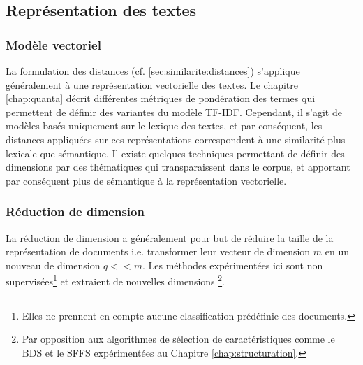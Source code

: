 


\subsection{Représentation des textes}
\label{sec:similarite:representation}
\subsubsection{Modèle vectoriel}
La formulation des distances (cf.  \ref{sec:similarite:distances}) s'applique généralement à une représentation vectorielle des textes. Le chapitre \ref{chap:quanta} décrit différentes métriques de pondération des termes qui permettent de définir des variantes du modèle TF-IDF. Cependant, il s'agit de modèles basés uniquement sur le lexique des textes, et par conséquent, les distances appliquées sur ces représentations  correspondent à une similarité plus lexicale que sémantique. Il existe quelques techniques permettant de définir des dimensions par des thématiques qui transparaissent dans le corpus, et apportant par conséquent plus de sémantique à la représentation vectorielle.

\subsubsection{Réduction de dimension}
\label{sec:similarite:reduction-dimension}
La réduction de dimension a généralement pour but de réduire la taille de la représentation de documents i.e. transformer leur vecteur de dimension $m$ en un nouveau de dimension $q << m$. Les méthodes expérimentées ici sont non supervisées\footnote{Elles ne prennent en compte aucune classification prédéfinie des documents.} et extraient de nouvelles dimensions \footnote{Par opposition aux algorithmes de sélection de caractéristiques comme le BDS et le SFFS expérimentées au Chapitre \ref{chap:structuration}.}. %

